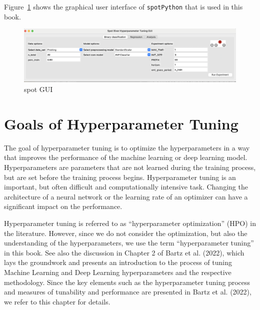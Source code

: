 \documentclass[
  letterpaper,
  DIV=11,
  numbers=noendperiod]{scrreprt}
\begin{document}
Figure~\ref{fig-spotGUI} shows the graphical user interface of
\texttt{spotPython} that is used in this book.

\begin{figure}

{\centering \includegraphics{./figures_static/spotGUI.png}

}

\caption{\label{fig-spotGUI}spot GUI}

\end{figure}

\hypertarget{sec-hyperparameter-tuning-goals}{%
\section{Goals of Hyperparameter
Tuning}\label{sec-hyperparameter-tuning-goals}}

The goal of hyperparameter tuning is to optimize the hyperparameters in
a way that improves the performance of the machine learning or deep
learning model. Hyperparameters are parameters that are not learned
during the training process, but are set before the training process
begins. Hyperparameter tuning is an important, but often difficult and
computationally intensive task. Changing the architecture of a neural
network or the learning rate of an optimizer can have a significant
impact on the performance.

Hyperparameter tuning is referred to as ``hyperparameter optimization''
(HPO) in the literature. However, since we do not consider the
optimization, but also the understanding of the hyperparameters, we use
the term ``hyperparameter tuning'' in this book. See also the discussion
in Chapter 2 of Bartz et al. (2022), which lays the groundwork and
presents an introduction to the process of tuning Machine Learning and
Deep Learning hyperparameters and the respective methodology. Since the
key elements such as the hyperparameter tuning process and measures of
tunability and performance are presented in Bartz et al. (2022), we
refer to this chapter for details.
\end{document}
